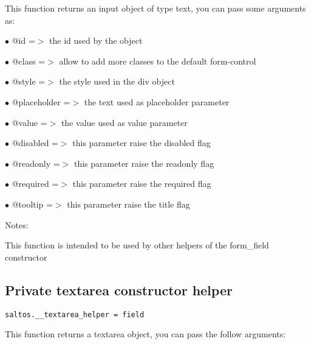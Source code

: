 \documentclass[a4paper]{book}
\begin{document}
This function returns an input object of type text, you can pass some arguments as:

\begin{compactitem}
\item[\color{myblue}$\bullet$] @id          =$>$ the id used by the object
\item[\color{myblue}$\bullet$] @class       =$>$ allow to add more classes to the default form-control
\item[\color{myblue}$\bullet$] @style       =$>$ the style used in the div object
\item[\color{myblue}$\bullet$] @placeholder =$>$ the text used as placeholder parameter
\item[\color{myblue}$\bullet$] @value       =$>$ the value used as value parameter
\item[\color{myblue}$\bullet$] @disabled    =$>$ this parameter raise the disabled flag
\item[\color{myblue}$\bullet$] @readonly    =$>$ this parameter raise the readonly flag
\item[\color{myblue}$\bullet$] @required    =$>$ this parameter raise the required flag
\item[\color{myblue}$\bullet$] @tooltip     =$>$ this parameter raise the title flag
\end{compactitem}

Notes:

This function is intended to be used by other helpers of the form\_field constructor

\hypertarget{toc406}{}
\subsection{Private textarea constructor helper}

\begin{lstlisting}
saltos.__textarea_helper = field
\end{lstlisting}

This function returns a textarea object, you can pass the follow arguments:
\end{document}
